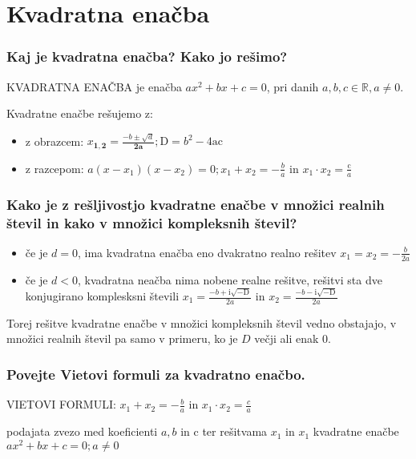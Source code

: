 \documentclass{article}
\begin{document}
\section{Kvadratna enačba}
\subsubsection*{Kaj je kvadratna enačba? Kako jo rešimo?}

KVADRATNA ENAČBA je enačba $a x^{2}+b x+c=0$, pri danih $a, b, c \in \mathbb{R}, a \neq 0$.

Kvadratne enačbe rešujemo z:
\begin{itemize}
    \item z obrazcem: $x_{\mathbf{1}, \mathbf{2}}=\frac{-b \pm \sqrt{d}}{\mathbf{2 a}} ; \mathrm{D}=b^{2}-4 \mathrm{ac}$
    \item z razcepom: $a\left(x-x_{1}\right)\left(x-x_{2}\right)=0 ; x_{1}+x_{2}=-\frac{b}{a}$ in $x_{1} \cdot x_{2}=\frac{\mathrm{c}}{a}$
\end{itemize}

\subsubsection*{Kako je z rešljivostjo kvadratne enačbe v množici realnih števil in kako v množici kompleksnih števil?}

\begin{itemize}
  \item če je $d=0$, ima kvadratna enačba eno dvakratno realno rešitev $x_{1}=x_{2}=-\frac{b}{2 a}$
  \item če je $d<0$, kvadratna neačba nima nobene realne rešitve, rešitvi sta dve konjugirano komplesksni števili $x_{1}=\frac{-b+\mathrm{i} \sqrt{-\mathrm{D}}}{2 a}$ in $x_{2}=\frac{-b-\mathrm{i} \sqrt{-\mathrm{D}}}{2 a}$
\end{itemize}

Torej rešitve kvadratne enačbe v množici kompleksnih števil vedno obstajajo, v množici realnih števil pa samo v primeru, ko je $D$ večji ali enak 0.

\subsubsection*{Povejte Vietovi formuli za kvadratno enačbo.}

VIETOVI FORMULI: $x_{1}+x_{2}=-\frac{b}{a}$ in $x_{1} \cdot x_{2}=\frac{c}{a}$

podajata zvezo med koeficienti $a, b$ in $\mathrm{c}$ ter rešitvama $x_{1}$ in $x_{1}$ kvadratne enačbe $a x^{2}+b x+c=0 ; a \neq 0$
\end{document}
